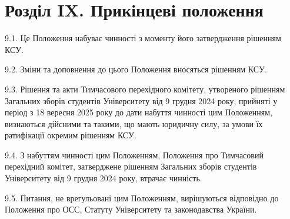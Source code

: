 \section*{Розділ IX. Прикінцеві положення}

    9.1. Це Положення набуває чинності з моменту його затвердження рішенням КСУ.

    9.2. Зміни та доповнення до цього Положення вносяться рішенням КСУ.

    9.3. Рішення та акти Тимчасового перехідного комітету, утвореного рішенням Загальних зборів студентів Університету від 9 грудня 2024 року, прийняті у період з 18 вересня 2025 року до дати набуття чинності цим Положенням, визнаються дійсними та такими, що мають юридичну силу, за умови їх ратифікації окремим рішенням КСУ.

    9.4. З набуттям чинності цим Положенням, Положення про Тимчасовий перехідний комітет, затверджене рішенням Загальних зборів студентів Університету від 9 грудня 2024 року, втрачає чинність.

    9.5. Питання, не врегульовані цим Положенням, вирішуються відповідно до Положення про ОСС, Статуту Університету та законодавства України.
